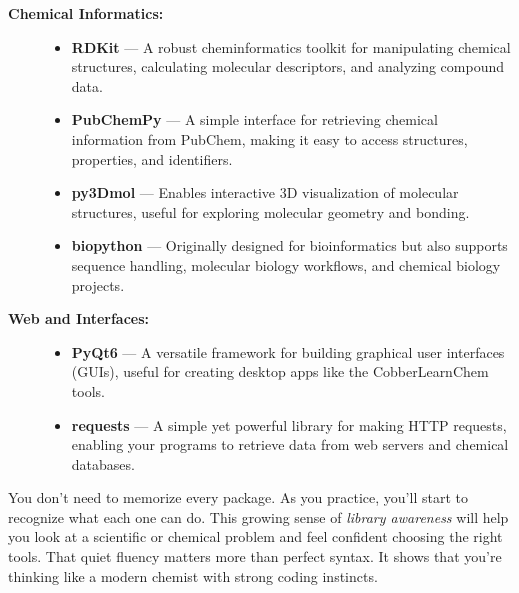 \begin{description}
\item[\textbf{Chemical Informatics:}] \mbox{}   
\begin{itemize}
    \item \textbf{RDKit} — A robust cheminformatics toolkit for manipulating chemical structures, calculating molecular descriptors, and analyzing compound data.
    \item \textbf{PubChemPy} — A simple interface for retrieving chemical information from PubChem, making it easy to access structures, properties, and identifiers.
    \item \textbf{py3Dmol} — Enables interactive 3D visualization of molecular structures, useful for exploring molecular geometry and bonding.
    \item \textbf{biopython} — Originally designed for bioinformatics but also supports sequence handling, molecular biology workflows, and chemical biology projects.
\end{itemize}



\item[\textbf{Web and Interfaces:}] \mbox{}   
\begin{itemize}
    \item \textbf{PyQt6} — A versatile framework for building graphical user interfaces (GUIs), useful for creating desktop apps like the CobberLearnChem tools.
    \item \textbf{requests} — A simple yet powerful library for making HTTP requests, enabling your programs to retrieve data from web servers and chemical databases.
\end{itemize}
\end{description}

\vspace{0.5em}


You don’t need to memorize every package. As you practice, you’ll start to recognize what each one can do. This growing sense of \textit{library awareness} will help you look at a scientific or chemical problem and feel confident choosing the right tools. That quiet fluency matters more than perfect syntax. It shows that you're thinking like a modern chemist with strong coding instincts.


